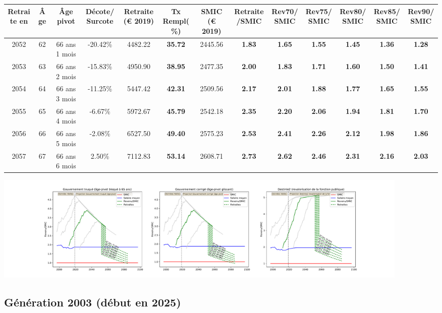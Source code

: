 { \scriptsize \begin{center} 
\begin{tabular}[htb]{|c|c||c|c||c|c||c||c|c|c|c|c|c|} 
\hline 
 Retraite en &  Âge &  Âge pivot &  Décote/Surcote &  Retraite (\euro{} 2019) &  Tx Rempl(\%) &  SMIC (\euro{} 2019) &  Retraite/SMIC &  Rev70/SMIC &  Rev75/SMIC &  Rev80/SMIC &  Rev85/SMIC &  Rev90/SMIC \\ 
\hline \hline 
 2052 &  62 &  66 ans 1 mois &  -20.42\% &  4482.22 &  {\bf 35.72} &  2445.56 &  {\bf 1.83} &  {\bf 1.65} &  {\bf 1.55} &  {\bf 1.45} &  {\bf 1.36} &  {\bf 1.28} \\ 
\hline 
 2053 &  63 &  66 ans 2 mois &  -15.83\% &  4950.90 &  {\bf 38.95} &  2477.35 &  {\bf 2.00} &  {\bf 1.83} &  {\bf 1.71} &  {\bf 1.60} &  {\bf 1.50} &  {\bf 1.41} \\ 
\hline 
 2054 &  64 &  66 ans 3 mois &  -11.25\% &  5447.42 &  {\bf 42.31} &  2509.56 &  {\bf 2.17} &  {\bf 2.01} &  {\bf 1.88} &  {\bf 1.77} &  {\bf 1.65} &  {\bf 1.55} \\ 
\hline 
 2055 &  65 &  66 ans 4 mois &  -6.67\% &  5972.67 &  {\bf 45.79} &  2542.18 &  {\bf 2.35} &  {\bf 2.20} &  {\bf 2.06} &  {\bf 1.94} &  {\bf 1.81} &  {\bf 1.70} \\ 
\hline 
 2056 &  66 &  66 ans 5 mois &  -2.08\% &  6527.50 &  {\bf 49.40} &  2575.23 &  {\bf 2.53} &  {\bf 2.41} &  {\bf 2.26} &  {\bf 2.12} &  {\bf 1.98} &  {\bf 1.86} \\ 
\hline 
 2057 &  67 &  66 ans 6 mois &  2.50\% &  7112.83 &  {\bf 53.14} &  2608.71 &  {\bf 2.73} &  {\bf 2.62} &  {\bf 2.46} &  {\bf 2.31} &  {\bf 2.16} &  {\bf 2.03} \\ 
\hline 
\hline 
\end{tabular} 
\end{center} } 

 \begin{center}\includegraphics[width=0.9\textwidth]{fig/Magistrat_1990_22_dest_retraite.pdf}\end{center} \label{fig/Magistrat_1990_22_dest_retraite.pdf} 

\newpage 
 
\subsection{Génération 2003 (début en 2025)} 

